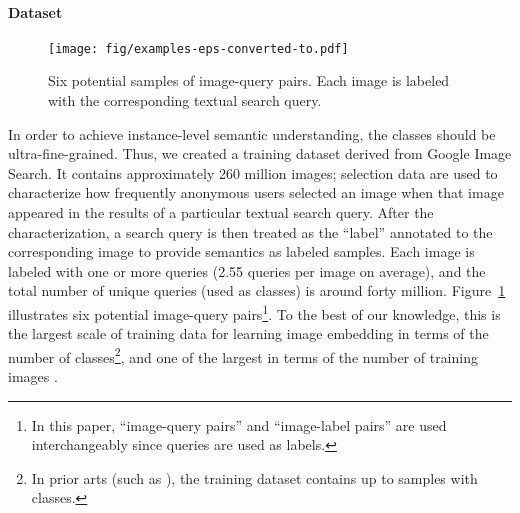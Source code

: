 \documentclass[sigconf]{acmart}
\begin{document}
\paragraph{Dataset}
\begin{comment}
The JFT-300M dataset is closely related and derived from the data which powers the Google Images. In this version, the dataset has 300M images and 375M labels, on average each image has 1.26 labels. These images are labeled with 18291 categories: e.g., 1165 type of animals and 5720 types of vehicles are labeled in the dataset. These categories form a rich hierarchy with the maximum depth of hierarchy being 12 and maximum number of child for parent node being 2876. The images are labeled using an algorithm that uses complex mixture of raw web signals, connections between webpages and user feedback. The algorithm starts from over one billion image label pairs, and ends up with 375M labels for 300M images with the aim to select labeled images with high precision.
\end{comment}

\begin{figure}[tbp]
  \texttt{[image: fig/examples-eps-converted-to.pdf]}
  \caption{Six potential samples of image-query pairs. Each image is labeled with the corresponding textual search query.}
  \label{fig:six_training_samples}
\end{figure}

In order to achieve instance-level semantic understanding, the classes should be ultra-fine-grained. Thus, we created a training dataset  derived from Google Image Search. It contains approximately 260 million images; selection data are used to characterize how frequently anonymous users selected an image when that image appeared in the results of a particular textual search query. After the characterization, a search query is then treated as the ``label'' annotated to the corresponding image to provide semantics as labeled samples. Each image is labeled with one or more queries (2.55 queries per image on average), and the total number of unique queries (used as classes) is around forty million. Figure~\ref{fig:six_training_samples} illustrates six potential image-query pairs\footnote{In this paper, ``image-query pairs'' and ``image-label pairs'' are used interchangeably since queries are used as labels.}. To the best of our knowledge, this is the largest scale of training data for learning image embedding in terms of the number of classes\footnote{In prior arts (such as \cite{wang2014learning}), the training dataset contains up to  samples with  classes.}, and one of the largest in terms of the number of training images \cite{sun2017revisiting,wang2014learning,schroff2015facenet}.
\end{document}
